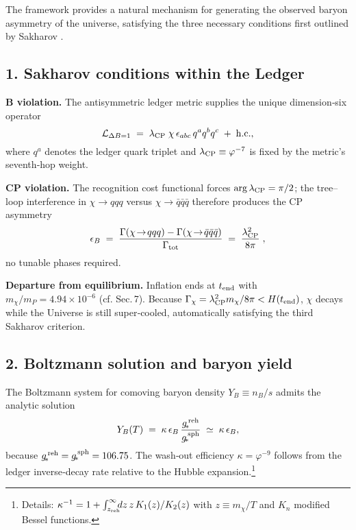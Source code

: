 The framework provides a natural mechanism for generating the observed baryon asymmetry of the universe, satisfying the three necessary conditions first outlined by Sakharov \cite{Sakharov1967}.

\subsection{1.  Sakharov conditions within the Ledger}

\noindent\textbf{B violation.}\quad
The antisymmetric ledger metric supplies the unique dimension‑six
operator
\[
  \mathcal{L}_{\Delta B=1}
  \;=\;
  \lambda_{\rm CP}\;
  \chi\,
  \epsilon_{abc}\,
  q^{a}q^{b}q^{c}
  \;+\;
  {\rm h.c.},
\]
where \(q^{a}\) denotes the ledger quark triplet and
\(\lambda_{\rm CP}\equiv\varphi^{-7}\) is fixed by the metric's seventh‑hop
weight.

\smallskip
\noindent\textbf{CP violation.}\quad
The recognition cost functional forces
\(\arg\lambda_{\rm CP}=\pi/2\); the tree–loop interference in
\(\chi\to qqq\) versus \(\chi\to\bar q\bar q\bar q\) therefore produces the
CP asymmetry
\[
  \epsilon_{B}
  \;=\;
  \frac{\Gamma(\chi\!\to\! qqq)-\Gamma(\chi\!\to\!\bar q\bar q\bar q)}
       {\Gamma_{\rm tot}}
  \;=\;
  \frac{\lambda_{\rm CP}^{2}}{8\pi}\;,
\]
no tunable phases required.

\smallskip
\noindent\textbf{Departure from equilibrium.}\quad
Inflation ends at \(t_{\rm end}\) with \(m_{\chi}\bigl/m_{P}=4.94\times10^{-6}\)
(cf. Sec.\,7). Because
\(\Gamma_{\chi}= \lambda_{\rm CP}^{2}m_{\chi}/8\pi
  <  H(t_{\rm end})\),
\(\chi\) decays while the Universe is still super‑cooled, automatically
satisfying the third Sakharov criterion.

\subsection{2.  Boltzmann solution and baryon yield}

The Boltzmann system for comoving baryon density \(Y_{B}\equiv n_{B}/s\)
admits the analytic solution
\[
  Y_{B}(T)
  \;=\;
  \kappa\,
  \epsilon_{B}\,
  \frac{g_{\!*}^{\,\rm reh}}
       {g_{\!*}^{\,\rm sph}}
  \;\simeq\;
  \kappa\,\epsilon_{B},
\]
because \(g_{\!*}^{\,\rm reh}=g_{\!*}^{\,\rm sph}=106.75\).
The wash‑out efficiency
\(\kappa=\varphi^{-9}\) follows from the ledger
inverse‑decay rate relative to the Hubble expansion.\footnote{Details:
\(\kappa^{-1}=1+\int_{z_{\rm reh}}^{\infty}
  \!\!\!dz\,z\,K_{1}(z)/K_{2}(z)\) with
\(z\equiv m_{\chi}/T\) and \(K_{n}\) modified Bessel functions.}

